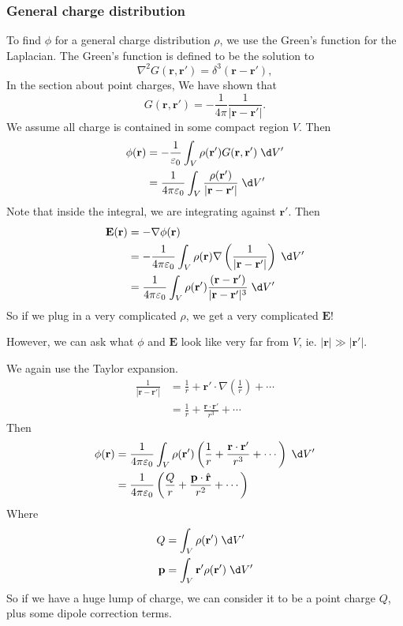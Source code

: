 \documentclass[a4paper]{article}
\begin{document}
\subsubsection{General charge distribution}
To find $\phi$ for a general charge distribution $\rho$, we use the Green's function for the Laplacian. The Green's function is defined to be the solution to
\[
  \nabla^2 G(\mathbf{r}, \mathbf{r}') = \delta^3(\mathbf{r} - \mathbf{r}'),
\]
In the section about point charges, We have shown that
\[
  G(\mathbf{r}, \mathbf{r}') = -\frac{1}{4\pi}\frac{1}{|\mathbf{r} - \mathbf{r}'|}.
\]
We assume all charge is contained in some compact region $V$. Then
\begin{align*}
  \phi(\mathbf{r}) &= -\frac{1}{\varepsilon_0}\int_V \rho(\mathbf{r}') G(\mathbf{r}, \mathbf{r}')\;\d V'\\
  &= \frac{1}{4\pi\varepsilon_0}\int_V \frac{\rho(\mathbf{r}')}{|\mathbf{r} - \mathbf{r}'|}\;\d V'
\end{align*}
Note that inside the integral, we are integrating against $\mathbf{r}'$. Then
\begin{align*}
  \mathbf{E}(\mathbf{r}) &= -\nabla \phi(\mathbf{r})\\
  &=- \frac{1}{4\pi\varepsilon_0} \int_V \rho(\mathbf{r})\nabla \left(\frac{1}{|\mathbf{r} - \mathbf{r}'|}\right)\;\d V'\\
  &= \frac{1}{4\pi\varepsilon_0}\int_V \rho(\mathbf{r}')\frac{(\mathbf{r} - \mathbf{r}')}{|\mathbf{r} - \mathbf{r}'|^3}\;\d V'
\end{align*}
So if we plug in a very complicated $\rho$, we get a very complicated $\mathbf{E}$!

However, we can ask what $\phi$ and $\mathbf{E}$ look like very far from $V$, ie. $|\mathbf{r}| \gg |\mathbf{r}'|$.

We again use the Taylor expansion.
\begin{align*}
  \frac{1}{|\mathbf{r} - \mathbf{r}'|} &= \frac{1}{r} + \mathbf{r}'\cdot \nabla\left(\frac{1}{r}\right) + \cdots\\
  &= \frac{1}{r} + \frac{\mathbf{r}\cdot \mathbf{r}'}{r^3} + \cdots
\end{align*}
Then
\begin{align*}
  \phi(\mathbf{r}) &= \frac{1}{4\pi\varepsilon_0} \int_V \rho(\mathbf{r}')\left(\frac{1}{r} + \frac{\mathbf{r}\cdot \mathbf{r}'}{r^3} + \cdots\right)\;\d V'\\
  &= \frac{1}{4\pi\varepsilon_0}\left(\frac{Q}{r} + \frac{\mathbf{p}\cdot \hat{\mathbf{r}}}{r^2} + \cdots\right)
\end{align*}
Where
\begin{align*}
  Q &= \int_V \rho(\mathbf{r}')\;\d V' \\
  \mathbf{p} &= \int_V \mathbf{r}'\rho(\mathbf{r}')\; \d V'
\end{align*}
So if we have a huge lump of charge, we can consider it to be a point charge $Q$, plus some dipole correction terms.
\end{document}
